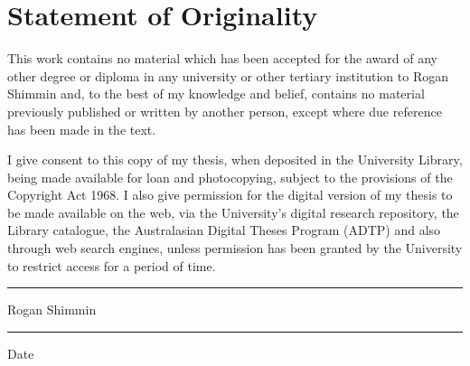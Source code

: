 \chapter*{Statement of Originality}
{}

\vfill

This work contains no material which has been accepted for the award of any other degree or diploma in any university or other tertiary institution to Rogan Shimmin and, to the best of my knowledge and belief, contains no material previously published or written by another person, except where due reference has been made in the text. 

I give consent to this copy of my thesis, when deposited in the University Library, being made available for loan and photocopying, subject to the provisions of the Copyright Act 1968. I also give permission for the digital version of my thesis to be made available on the web, via the University’s digital research repository, the Library catalogue, the Australasian Digital Theses Program (ADTP) and also through web search engines, unless permission has been granted by the University to restrict access for a period of time.\\[2cm]

\rule{5cm}{0.5mm}

Rogan Shimmin\\[1cm]

\rule{5cm}{0.5mm}

Date

\vfill